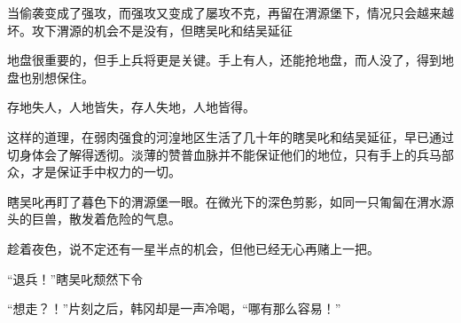 当偷袭变成了强攻，而强攻又变成了屡攻不克，再留在渭源堡下，情况只会越来越坏。攻下渭源的机会不是没有，但瞎吴叱和结吴延征

地盘很重要的，但手上兵将更是关键。手上有人，还能抢地盘，而人没了，得到地盘也别想保住。

存地失人，人地皆失，存人失地，人地皆得。

这样的道理，在弱肉强食的河湟地区生活了几十年的瞎吴叱和结吴延征，早已通过切身体会了解得透彻。淡薄的赞普血脉并不能保证他们的地位，只有手上的兵马部众，才是保证手中权力的一切。

瞎吴叱再盯了暮色下的渭源堡一眼。在微光下的深色剪影，如同一只匍匐在渭水源头的巨兽，散发着危险的气息。

趁着夜色，说不定还有一星半点的机会，但他已经无心再赌上一把。

“退兵！”瞎吴叱颓然下令

“想走？！”片刻之后，韩冈却是一声冷喝，“哪有那么容易！”

